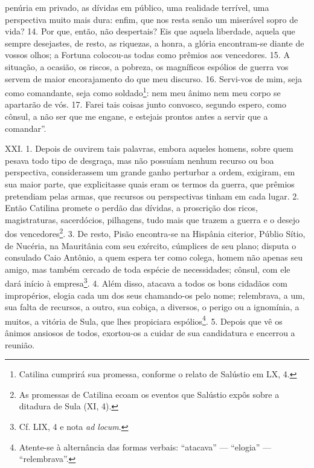 penúria em privado, as dívidas em público, uma realidade terrível, uma
perspectiva muito mais dura: enfim, que nos resta senão um miserável sopro de
vida? 14. Por que, então, não despertais? Eis que aquela liberdade, aquela que
sempre desejastes, de resto, as riquezas, a honra, a glória encontram-se diante
de vossos olhos; a Fortuna colocou-as todas como prêmios aos vencedores. 15. A
situação, a ocasião, os riscos, a pobreza, os magníficos espólios de guerra vos
servem de maior encorajamento do que meu discurso. 16. Servi-vos de mim, seja
como comandante, seja como soldado\footnote{Catilina cumprirá sua promessa,
conforme o relato de Salústio em LX, 4.}: nem meu ânimo nem meu corpo se
apartarão de vós. 17. Farei tais coisas junto convosco, segundo espero, como
cônsul, a não ser que me engane, e estejais prontos antes a servir que a
comandar”.

XXI. 1. Depois de ouvirem tais palavras, embora aqueles  homens, sobre quem pesava todo tipo de desgraça, mas não possuíam  nenhum recurso ou boa perspectiva,
considerassem um grande ganho perturbar a ordem, exigiram, em sua maior parte, que
explicitasse quais eram os termos da guerra, que prêmios pretendiam pelas
armas, que recursos ou perspectivas tinham em cada lugar. 2. Então Catilina
promete o perdão das dívidas, a proscrição dos ricos, magistraturas,
sacerdócios, pilhagens, tudo mais que trazem a guerra e o desejo dos
vencedores\footnote{As promessas de Catilina ecoam os eventos que Salústio
expôs sobre a ditadura de Sula (XI, 4).}. 3. De resto, Pisão encontra-se na
Hispânia citerior, Públio Sítio, de Nucéria, na Mauritânia com seu exército,
cúmplices de seu plano; disputa o consulado Caio Antônio, a quem espera ter
como colega, homem não apenas seu amigo, mas também cercado de toda espécie de
necessidades; cônsul, com ele dará início à empresa\footnote{Cf. LIX, 4 e nota \emph{ad locum}.}. 4.
Além disso, atacava a todos os bons cidadãos com impropérios, elogia cada um
dos seus chamando-os pelo nome; relembrava, a um, sua falta de recursos,
a outro, sua cobiça, a diversos, o perigo ou a ignomínia, a muitos, a vitória
de Sula, que lhes propiciara espólios\footnote{Atente-se à alternância das formas
verbais: ``atacava'' --- ``elogia'' --- ``relembrava''.}. 5. Depois que vê os ânimos ansiosos de
todos, exortou-os a cuidar de sua candidatura e encerrou a reunião.


